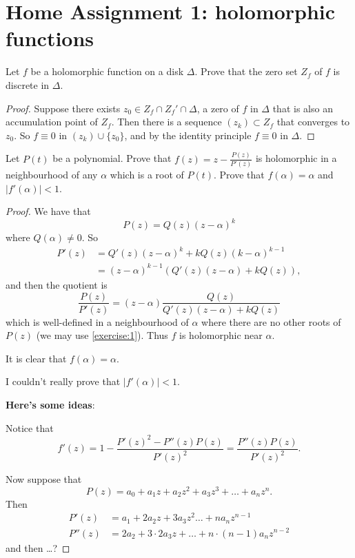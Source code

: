 \documentclass{article}
\numberwithin{equation}{section}
\begin{document}
\section{Home Assignment 1: holomorphic functions}
\thispagestyle{fancy}


\begin{exercise}\label{exercise:1}
	Let $f$ be a holomorphic function on a disk $\Delta$. Prove that the zero set $Z_f$ of $f$ is discrete in $\Delta$.
\end{exercise}
\begin{proof}
	
	
	Suppose there exists $z_0\in Z_f\cap Z_f'\cap \Delta$, a zero of $f$ in $\Delta$ that is also an accumulation point of $Z_f$. Then there is a sequence $(z_k)\subset Z_f$ that converges to $z_0$. So $f\equiv0$ in $(z_k)\cup\{z_0\}$, and by the identity principle $f\equiv0$ in $\Delta$.
\end{proof}

\begin{exercise}\label{exercise:2}
	Let $P(t)$ be a polynomial. Prove that $f(z) = z - \frac{P (z)}{P'(z)}$ is holomorphic
	 in a neighbourhood of any $\alpha$ which is a root of $P(t)$. Prove that $f(\alpha) = \alpha$ and $|f'(\alpha)| < 1$.
\end{exercise}
\begin{proof}
	We have that
	\[P(z)=Q(z)(z-\alpha)^k\]
	where $Q(\alpha)\neq0$. So
	\begin{align*}
		P'(z)&=Q'(z)(z-\alpha)^k+kQ(z)(k-\alpha)^{k-1}\\
		&=(z-\alpha)^{k-1}(Q'(z)(z-\alpha)+kQ(z)),
	\end{align*}
	and then the quotient is
	\[\frac{P(z)}{P'(z)}=(z-\alpha)\frac{Q(z)}{Q'(z)(z-\alpha)+kQ(z)}\]
	which is well-defined in a neighbourhood of $\alpha$ where there are no other roots of $P(z)$ (we may use \cref{exercise:1}). Thus $f$ is holomorphic near $\alpha$.
	
	It is clear that $f(\alpha)=\alpha$.
	
	{\color{blue-violet} I couldn't really prove that $|f'(\alpha)|<1$.
	
	\textbf{Here's some ideas}:
	
	Notice that
	\[f'(z)=1-\frac{P'(z)^2-P''(z)P(z)}{P'(z)^2}=\frac{P''(z)P(z)}{P'(z)^2}.\]
	
	Now suppose that
	\[P(z)
	=a_0+a_1z+a_2z^2+a_3z^3+\ldots+a_nz^n.\]
	Then
	\begin{align*}
		P'(z)&=a_1+2a_2z+3a_3z^2\ldots+na_nz^{n-1}\\
		P''(z)&=2a_2+3\cdot2a_3z+\ldots+n\cdot(n-1)a_nz^{n-2}
	\end{align*}
	and then …?}
\end{proof}
\end{document}

